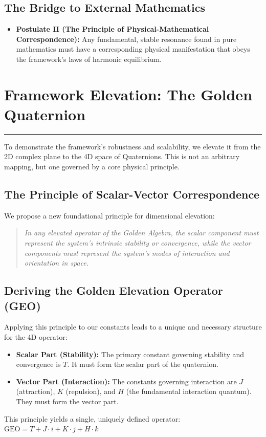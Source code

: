 \subsection*{The Bridge to External Mathematics}
\begin{itemize}
    \item \textbf{Postulate II (The Principle of Physical-Mathematical Correspondence):} Any fundamental, stable resonance found in pure mathematics must have a corresponding physical manifestation that obeys the framework's laws of harmonic equilibrium.
\end{itemize}


\section{Framework Elevation: The Golden Quaternion}
\label{chap:quaternion_elevation}

\hrule
\vspace{1em}
To demonstrate the framework's robustness and scalability, we elevate it from the 2D complex plane to the 4D space of Quaternions. This is not an arbitrary mapping, but one governed by a core physical principle.

\subsection*{The Principle of Scalar-Vector Correspondence}
We propose a new foundational principle for dimensional elevation:
\begin{quote}
    \textit{In any elevated operator of the Golden Algebra, the scalar component must represent the system's intrinsic stability or convergence, while the vector components must represent the system's modes of interaction and orientation in space.}
\end{quote}

\subsection*{Deriving the Golden Elevation Operator (GEO)}
Applying this principle to our constants leads to a unique and necessary structure for the 4D operator:
\begin{itemize}
    \item \textbf{Scalar Part (Stability):} The primary constant governing stability and convergence is $T$. It must form the scalar part of the quaternion.
    \item \textbf{Vector Part (Interaction):} The constants governing interaction are $J$ (attraction), $K$ (repulsion), and $H$ (the fundamental interaction quantum). They must form the vector part.
\end{itemize}
This principle yields a single, uniquely defined operator:
$ \text{GEO} = T + J\cdot i + K\cdot j + H\cdot k $

